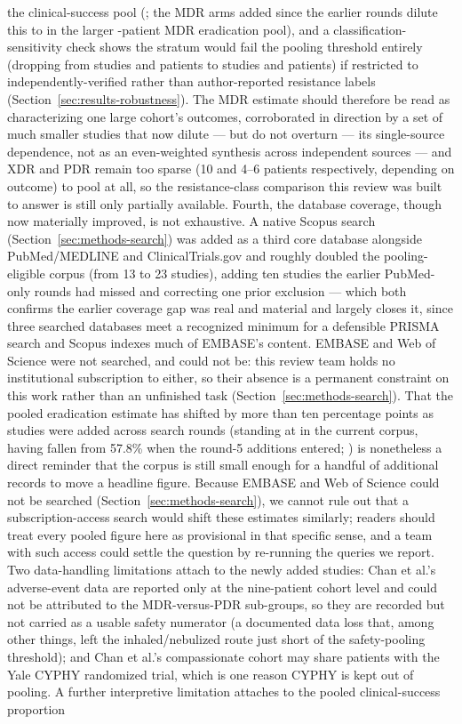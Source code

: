 the clinical-success pool (\PirnayShareMDRCs ; the MDR arms added since the earlier rounds dilute this to \PirnayShareMDRErad in the larger \PoolNMDRErad -patient MDR eradication pool), and a classification-sensitivity check shows the stratum would fail the pooling threshold entirely (dropping from \ClassMDRStudiesAll studies and \ClassMDRPatientsAll patients to \ClassMDRStudiesVerified studies and \ClassMDRPatientsVerified patients) if restricted to independently-verified rather than author-reported resistance labels (Section~\ref{sec:results-robustness}). The MDR estimate should therefore be read as characterizing one large cohort's outcomes, corroborated in direction by a set of much smaller studies that now dilute --- but do not overturn --- its single-source dependence, not as an even-weighted synthesis across independent sources --- and XDR and PDR remain too sparse (10 and 4--6 patients respectively, depending on outcome) to pool at all, so the resistance-class comparison this review was built to answer is still only partially available. Fourth, the database coverage, though now materially improved, is not exhaustive. A native Scopus search (Section~\ref{sec:methods-search}) was added as a third core database alongside PubMed/MEDLINE and ClinicalTrials.gov and roughly doubled the pooling-eligible corpus (from 13 to 23 studies), adding ten studies the earlier PubMed-only rounds had missed and correcting one prior exclusion --- which both confirms the earlier coverage gap was real and material and largely closes it, since three searched databases meet a recognized minimum for a defensible PRISMA search and Scopus indexes much of EMBASE's content. EMBASE and Web of Science were not searched, and could not be: this review team holds no institutional subscription to either, so their absence is a permanent constraint on this work rather than an unfinished task (Section~\ref{sec:methods-search}). That the pooled eradication estimate has shifted by more than ten percentage points as studies were added across search rounds (standing at \EradOverallEst in the current corpus, having fallen from 57.8\% when the round-5 additions entered; ) is nonetheless a direct reminder that the corpus is still small enough for a handful of additional records to move a headline figure. Because EMBASE and Web of Science could not be searched (Section~\ref{sec:methods-search}), we cannot rule out that a subscription-access search would shift these estimates similarly; readers should treat every pooled figure here as provisional in that specific sense, and a team with such access could settle the question by re-running the queries we report. Two data-handling limitations attach to the newly added studies: Chan et al.'s adverse-event data are reported only at the nine-patient cohort level and could not be attributed to the MDR-versus-PDR sub-groups, so they are recorded but not carried as a usable safety numerator (a documented data loss that, among other things, left the inhaled/nebulized route just short of the safety-pooling threshold); and Chan et al.'s compassionate cohort may share patients with the Yale CYPHY randomized trial, which is one reason CYPHY is kept out of pooling. A further interpretive limitation attaches to the pooled clinical-success proportion 